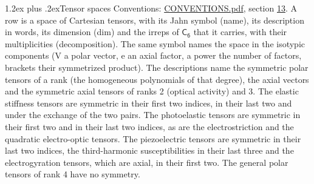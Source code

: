 \documentclass[10pt,a4paper]{article}
\makeatletter
\renewcommand\section{\@startsection{section}{1}{\z@}{-3ex plus -1ex minus -.2ex}%
  {1.2ex plus .2ex}{\normalfont\large\sffamily\bfseries\color{parttitle}}}
\numberwithin{equation}{section}
\newcommand{\grp}[1]{\mathsf{#1}}
\makeatother
\begin{document}
\section{Tensor spaces}\label{s:tensor_spaces}
Conventions: \href{../../CONVENTIONS.pdf}{CONVENTIONS.pdf}, section \href{../../CONVENTIONS.pdf\#conv.13}{13}.
\leavevmode\label{n:head.name}\label{n:head.description}\label{n:head.dim}\label{n:head.decomposition}A row is a space of Cartesian tensors, with its Jahn symbol (name), its description in words, its dimension (dim) and the irreps of $\grp{C_{6}}$ that it carries, with their multiplicities (decomposition). \label{n:label.jahn}The same symbol names the space in the isotypic components (V a polar vector, e an axial factor, a power the number of factors, brackets their symmetrized product). The descriptions name the symmetric polar tensors of a rank (the homogeneous polynomials of that degree), the axial vectors and the symmetric axial tensors of ranks 2 (optical activity) and 3. The elastic stiffness tensors are symmetric in their first two indices, in their last two and under the exchange of the two pairs. The photoelastic tensors are symmetric in their first two and in their last two indices, as are the electrostriction and the quadratic electro-optic tensors. The piezoelectric tensors are symmetric in their last two indices, the third-harmonic susceptibilities in their last three and the electrogyration tensors, which are axial, in their first two. The general polar tensors of rank 4 have no symmetry.
\end{document}
